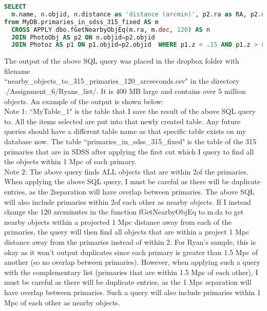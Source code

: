 \documentclass[10pt,letterpaper]{article}
\begin{document}
\begin{lstlisting}[language=SQL, breaklines=true]
SELECT 
  m.name, n.objid, n.distance as 'distance (arcmin)', p2.ra as RA, p2.dec as DEC
from MyDB.primaries_in_sdss_315_fixed AS m 
  CROSS APPLY dbo.fGetNearbyObjEq(m.ra, m.dec, 120) AS n
  JOIN PhotoObj AS p2 ON n.objid=p2.objid 
  JOIN Photoz AS p1 ON p1.objid=p2.objid  WHERE p1.z < .15 AND p1.z > 0
\end{lstlisting}

The output of the above SQL query was placed in the dropbox folder with filename\\ ``nearby\_objects\_to\_315\_primaries\_120\_arcseconds.csv" in the directory ./Assignment\_6/Ryans\_list/. It is 400 MB large and contains over 5 million objects. An example of the output is shown below:\\

  
Note 1: ``MyTable\_1" is the table that I save the result of the above SQL query to. All the items selected are put into that newly created table. Any future queries should have a different table name as that specific table exists on my database now. The table ``primaries\_in\_sdss\_315\_fixed" is the table of the 315 primaries that are in SDSS after applying the first cut which I query to find all the objects within 1 Mpc of each primary.\\

Note 2: The above query finds ALL objects that are within 2\degree of the primaries. When applying the above SQL query, I must be careful as there will be duplicate entries, as the 2\degree separation will have overlap between primaries. The above SQL will also include primaries within 2\degree of each other as nearby objects. If I instead change the 120 arcminutes in the function fGetNearbyObjEq to m.da to get nearby objects within a projected 1 Mpc distance away from each of the primaries, the query will then find all objects that are within a project 1 Mpc distance away from the primaries instead of within 2\degree. For Ryan's sample, this is okay as it won't output duplicates since each primary is greater than 1.5 Mpc of another (so no overlap between primaries). However, when applying such a query with the complementary list (primaries that are within 1.5 Mpc of each other), I must be careful as there will be duplicate entries, as the 1 Mpc separation will have overlap between primaries. Such a query will also include primaries within 1 Mpc of each other as nearby objects.\\
\end{document}
